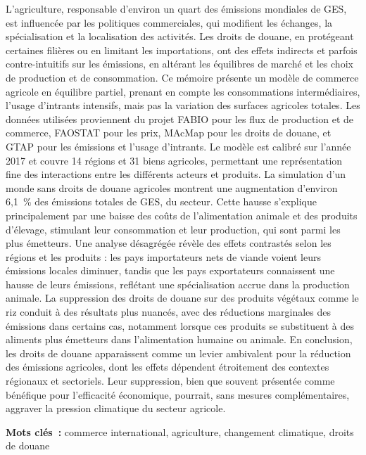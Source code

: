 L’agriculture, responsable d’environ un quart des émissions mondiales de GES, est influencée par les politiques commerciales, qui modifient les échanges, la spécialisation et la localisation des activités. Les droits de douane, en protégeant certaines filières ou en limitant les importations, ont des effets indirects et parfois contre-intuitifs sur les émissions, en altérant les équilibres de marché et les choix de production et de consommation. Ce mémoire présente un modèle de commerce agricole en équilibre partiel, prenant en compte les consommations intermédiaires, l'usage d'intrants intensifs, mais pas la variation des surfaces agricoles totales. Les données utilisées proviennent du projet FABIO pour les flux de production et de commerce, FAOSTAT pour les prix, MAcMap pour les droits de douane, et GTAP pour les émissions et l’usage d’intrants. Le modèle est calibré sur l’année 2017 et couvre 14 régions et 31 biens agricoles, permettant une représentation fine des interactions entre les différents acteurs et produits. La simulation d'un monde sans droits de douane agricoles montrent une augmentation d’environ 6,1~\% des émissions totales de GES, du secteur. Cette hausse s’explique principalement par une baisse des coûts de l’alimentation animale et des produits d’élevage, stimulant leur consommation et leur production, qui sont parmi les plus émetteurs. Une analyse désagrégée révèle des effets contrastés selon les régions et les produits : les pays importateurs nets de viande voient leurs émissions locales diminuer, tandis que les pays exportateurs connaissent une hausse de leurs émissions, reflétant une spécialisation accrue dans la production animale. La suppression des droits de douane sur des produits végétaux comme le riz conduit à des résultats plus nuancés, avec des réductions marginales des émissions dans certains cas, notamment lorsque ces produits se substituent à des aliments plus émetteurs dans l’alimentation humaine ou animale. En conclusion, les droits de douane apparaissent comme un levier ambivalent pour la réduction des émissions agricoles, dont les effets dépendent étroitement des contextes régionaux et sectoriels. Leur suppression, bien que souvent présentée comme bénéfique pour l’efficacité économique, pourrait, sans mesures complémentaires, aggraver la pression climatique du secteur agricole.

\textbf{Mots clés~:} commerce international, agriculture, changement climatique, droits de douane
